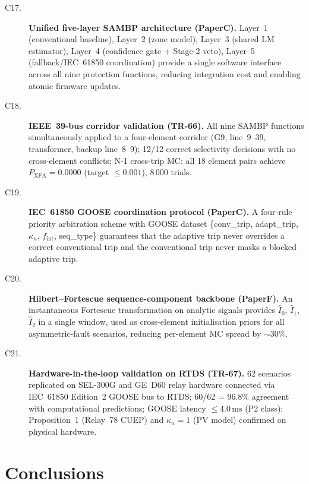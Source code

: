\documentclass
    [phd,synopsis]
    {iitmdissertation}
\newcommand{\kn}{\kappa_n}
\begin{document}
\begin{description}
  \item[C17.] \textbf{Unified five-layer SAMBP architecture (PaperC).}
    Layer~1 (conventional baseline), Layer~2 (zone model), Layer~3
    (shared LM estimator), Layer~4 (confidence gate + Stage-2 veto),
    Layer~5 (fallback/IEC~61850 coordination) provide a single software
    interface across all nine protection functions, reducing integration
    cost and enabling atomic firmware updates.

  \item[C18.] \textbf{IEEE~39-bus corridor validation (TR-66).}
    All nine SAMBP functions simultaneously applied to a four-element
    corridor (G9, line~9--39, transformer, backup line~8--9);
    12/12 correct selectivity decisions with no cross-element conflicts;
    N-1 cross-trip MC: all 18 element pairs achieve
    $P_{\mathrm{XFA}} = 0.0000$ (target $\leq 0.001$), 8\,000 trials.

  \item[C19.] \textbf{IEC~61850 GOOSE coordination protocol (PaperC).}
    A four-rule priority arbitration scheme with GOOSE dataset
    \{conv\_trip, adapt\_trip, $\kn$, $f_{\mathrm{int}}$, seq\_type\}
    guarantees that the adaptive trip never overrides a correct conventional
    trip and the conventional trip never masks a blocked adaptive trip.

  \item[C20.] \textbf{Hilbert--Fortescue sequence-component backbone
    (PaperF).}
    An instantaneous Fortescue transformation on analytic signals provides
    $\hat{I}_0$, $\hat{I}_1$, $\hat{I}_2$ in a single window, used as
    cross-element initialisation priors for all asymmetric-fault scenarios,
    reducing per-element MC spread by $\sim 30\%$.

  \item[C21.] \textbf{Hardware-in-the-loop validation on RTDS (TR-67).}
    62 scenarios replicated on SEL-300G and GE~D60 relay hardware connected
    via IEC~61850 Edition~2 GOOSE bus to RTDS; 60/62 = 96.8\% agreement with
    computational predictions; GOOSE latency $\leq 4.0\,\text{ms}$
    (P2 class); Proposition~1 (Relay~78 CUEP) and $\kn = 1$ (PV model)
    confirmed on physical hardware.
\end{description}

\section{Conclusions}
\end{document}
